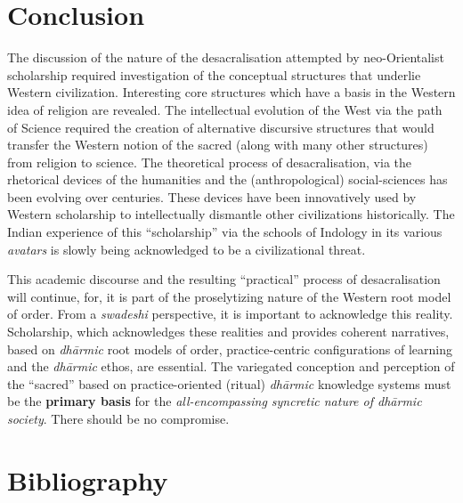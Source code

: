 \section*{Conclusion}

The discussion of the nature of the desacralisation attempted by neo-Orientalist scholarship required investigation of the conceptual structures that underlie Western civilization. Interesting core structures which have a basis in the Western idea of religion are revealed. The intellectual evolution of the West via the path of Science required the creation of alternative discursive structures that would transfer the Western notion of the sacred (along with many other structures) from religion to science. The theoretical process of desacralisation, via the rhetorical devices of the humanities and the (anthropological) social-sciences has been evolving over centuries. These devices have been innovatively used by Western scholarship to intellectually dismantle other civilizations historically. The Indian experience of this “scholarship” via the schools of Indology in its various \textit{avatars} is slowly being acknowledged to be a civilizational threat. 

This academic discourse and the resulting “practical” process of desacralisation will continue, for, it is part of the proselytizing nature of the Western root model of order. From a \textit{swadeshi} perspective, it is important to acknowledge this reality. Scholarship, which acknowledges these realities and provides coherent narratives, based on \textit{dhārmic} root models of order, practice-centric configurations of learning and the \textit{dhārmic} ethos, are essential. The variegated conception and perception of the “sacred” based on practice-oriented (ritual) \textit{dhārmic} knowledge systems must be the \textbf{primary basis} for the\textit{ all-encompassing syncretic nature of dhārmic society}. There should be no compromise.

\section*{Bibliography}

